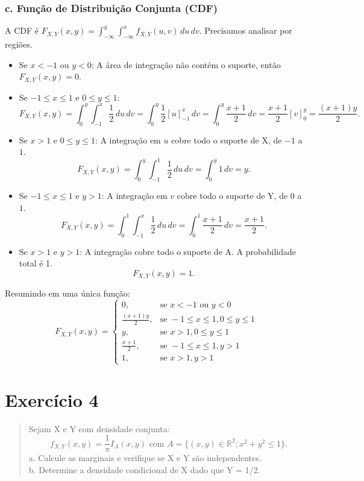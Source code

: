 \documentclass[12pt]{article}
\begin{document}
\subsubsection*{c. Função de Distribuição Conjunta (CDF)}
A CDF é $F_{X,Y}(x,y) = \int_{-\infty}^{y} \int_{-\infty}^{x} f_{X,Y}(u,v) \,du \,dv$. Precisamos analisar por regiões.

\begin{itemize}
    \item Se $x < -1$ ou $y < 0$: A área de integração não contém o suporte, então $F_{X,Y}(x,y) = 0$.
    \item Se $-1 \le x \le 1$ e $0 \le y \le 1$:
    \[ F_{X,Y}(x,y) = \int_{0}^{y} \int_{-1}^{x} \frac{1}{2} \,du \,dv = \int_{0}^{y} \frac{1}{2}[u]_{-1}^{x} \,dv = \int_{0}^{y} \frac{x+1}{2} \,dv = \frac{x+1}{2}[v]_{0}^{y} = \frac{(x+1)y}{2}. \]
    \item Se $x > 1$ e $0 \le y \le 1$: A integração em $u$ cobre todo o suporte de X, de $-1$ a $1$.
    \[ F_{X,Y}(x,y) = \int_{0}^{y} \int_{-1}^{1} \frac{1}{2} \,du \,dv = \int_{0}^{y} 1 \,dv = y. \]
    \item Se $-1 \le x \le 1$ e $y > 1$: A integração em $v$ cobre todo o suporte de Y, de $0$ a $1$.
    \[ F_{X,Y}(x,y) = \int_{0}^{1} \int_{-1}^{x} \frac{1}{2} \,du \,dv = \int_{0}^{1} \frac{x+1}{2} \,dv = \frac{x+1}{2}. \]
    \item Se $x > 1$ e $y > 1$: A integração cobre todo o suporte de A. A probabilidade total é 1.
    \[ F_{X,Y}(x,y) = 1. \]
\end{itemize}
Resumindo em uma única função:
\[ F_{X,Y}(x,y) = \begin{cases}
0, & \text{se } x < -1 \text{ ou } y < 0 \\
\frac{(x+1)y}{2}, & \text{se } -1 \le x \le 1, 0 \le y \le 1 \\
y, & \text{se } x > 1, 0 \le y \le 1 \\
\frac{x+1}{2}, & \text{se } -1 \le x \le 1, y > 1 \\
1, & \text{se } x > 1, y > 1
\end{cases} \]

\pagebreak

\section{Exercício 4}

\begin{quote}
Sejam X e Y com densidade conjunta:
\[ f_{X,Y}(x,y) = \frac{1}{\pi} I_A(x,y) \text{ com } A = \{(x,y) \in \mathbb{R}^2; x^2+y^2 \le 1\}. \]
a. Calcule as marginais e verifique se X e Y são independentes. \\
b. Determine a densidade condicional de X dado que Y = 1/2.
\end{quote}
\end{document}
